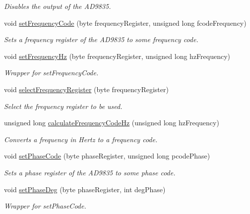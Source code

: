 \begin{DoxyCompactItemize}
\begin{DoxyCompactList}\small\item\em Disables the output of the AD9835. \end{DoxyCompactList}\item 
void \hyperlink{class_a_d9835_a69fed84e2d0491ec55a52fd2931d89b5}{setFrequencyCode} (byte frequencyRegister, unsigned long fcodeFrequency)
\begin{DoxyCompactList}\small\item\em Sets a frequency register of the AD9835 to some frequency code. \end{DoxyCompactList}\item 
void \hyperlink{class_a_d9835_a9ab0533b29eb79e5106540802b406586}{setFrequencyHz} (byte frequencyRegister, unsigned long hzFrequency)
\begin{DoxyCompactList}\small\item\em Wrapper for setFrequencyCode. \end{DoxyCompactList}\item 
void \hyperlink{class_a_d9835_a423c2ddd038660e60a910e3c94e77c74}{selectFrequencyRegister} (byte frequencyRegister)
\begin{DoxyCompactList}\small\item\em Select the frequency register to be used. \end{DoxyCompactList}\item 
unsigned long \hyperlink{class_a_d9835_ad4a64d42b806f67e57eb37db913e3873}{calculateFrequencyCodeHz} (unsigned long hzFrequency)
\begin{DoxyCompactList}\small\item\em Converts a frequency in Hertz to a frequency code. \end{DoxyCompactList}\item 
void \hyperlink{class_a_d9835_a8ed5f2a122cc1820e3f90b24bceba02f}{setPhaseCode} (byte phaseRegister, unsigned long pcodePhase)
\begin{DoxyCompactList}\small\item\em Sets a phase register of the AD9835 to some phase code. \end{DoxyCompactList}\item 
void \hyperlink{class_a_d9835_aef6909397bd5e3b9ba25e412ba0c59b0}{setPhaseDeg} (byte phaseRegister, int degPhase)
\begin{DoxyCompactList}\small\item\em Wrapper for setPhaseCode. \end{DoxyCompactList}\item 

\end{DoxyCompactItemize}
